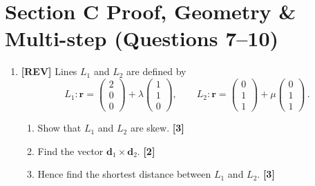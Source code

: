 \documentclass[11pt,a4paper]{article}
\begin{document}
\section*{Section C \quad Proof, Geometry \& Multi-step \hfill{\normalfont\small(Questions 7--10)}}
\begin{enumerate}[resume]
\item \textbf{[REV]} Lines $L_1$ and $L_2$ are defined by
\[
L_1 : \mathbf{r} = \begin{pmatrix} 2 \\ 0 \\ 0 \end{pmatrix} + \lambda\begin{pmatrix} 1 \\ 1 \\ 0 \end{pmatrix},
\qquad
L_2 : \mathbf{r} = \begin{pmatrix} 0 \\ 1 \\ 1 \end{pmatrix} + \mu\begin{pmatrix} 0 \\ 1 \\ 1 \end{pmatrix}\,.
\]
\begin{enumerate}
  \item Show that $L_1$ and $L_2$ are skew. \hfill{\small\textbf{[3]}}
  \item Find the vector $\mathbf{d}_1 \times \mathbf{d}_2$. \hfill{\small\textbf{[2]}}
  \item Hence find the shortest distance between $L_1$ and $L_2$. \hfill{\small\textbf{[3]}}
\end{enumerate}

\begin{center}
\begin{tikzpicture}[scale=1.0, >=Stealth]



\end{tikzpicture}
\end{center}
\end{enumerate}
\end{document}
